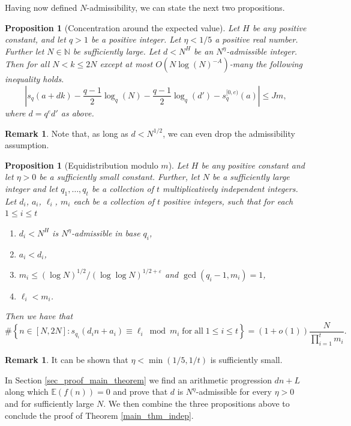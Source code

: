 \documentclass[12pt]{amsart}
\renewcommand{\leq}{\leqslant}
\newtheorem{proposition}[theorem]{Proposition}
\theoremstyle{definition}
\newtheorem{remark}[theorem]{Remark}
\numberwithin{equation}{section}
\newcommand\NN{\mathbb{N}}
\numberwithin{equation}{section}
\begin{document}
Having now defined $N$-admissibility, we can state the next two propositions.

\begin{proposition}[Concentration around the expected value]\label{thm_concentration}
	Let $H$ be any positive constant, and let $q>1$ be a positive integer. Let $\eta<1/5$ a positive real number. Further let $N\in \NN$ be sufficiently large. Let $d<N^H$ be an $N^{\eta}$-admissible integer. Then for all $N<k\leq2N$ except at most $O\left(N\log(N)^{-A}\right)$-many the following inequality holds.
	\[
		\left|s_q(a+dk)-\frac{q-1}2\log_{q}\left(N\right) - \frac{q-1}2\log_{q}(d')-s_q^{[0,e)}(a)\right|\leq Jm,
	\]
	where $d=q^ed'$ as above.
\end{proposition}
\begin{remark}
	Note that, as long as $d<N^{1/2}$, we can even drop the admissibility assumption.
\end{remark}

\begin{proposition}[Equidistribution modulo $m$]\label{prop_equi}
	Let $H$ be any positive constant  and let $\eta>0$ be a sufficiently small constant. Further, let $N$ be a sufficiently large integer and let $q_1,\dots, q_t$ be a collection of $t$ multiplicatively independent integers. Let $d_i$, $a_i$, $\ell_i$, $m_i$ each be a collection of $t$ positive integers, such that for each $1\leq i \leq t$
	\begin{enumerate}
		\item $d_i<N^H$ is $N^{\eta}$-admissible in base $q_i$,
		\item $a_i<d_i$,
		\item $m_i \leq (\log N)^{1/2}/(\log\log N)^{1/2+\varepsilon}$ and $\gcd(q_i-1,m_i)=1$,
		\item $\ell_i<m_i$.
	\end{enumerate}
	Then we have that
	\begin{equation}\label{eq_prop_size}
		\#\left\{ n\in[N,2N]: s_{q_i}(d_in+a_i)\equiv \ell_i\bmod m_i \; \mathrm{for}\; \mathrm{ all } \; 1\leq i \leq t
		\right\} = (1+o(1))\frac{N}{\prod_{i=1}^{t}m_i}.
	\end{equation}
\end{proposition}
\begin{remark}
	It can be shown that $\eta<\min(1/5,1/t)$ is sufficiently small.
\end{remark}

In Section \ref{sec_proof_main_theorem} we find an arithmetic progression $dn+L$ along which $\mathbb{E}(f(n))=0$ and prove that $d$ is $N^{\eta}$-admissible for every $\eta>0$ and for sufficiently large $N$. We then combine the three propositions above to conclude the proof of Theorem \ref{main_thm_indep}.
\end{document}

